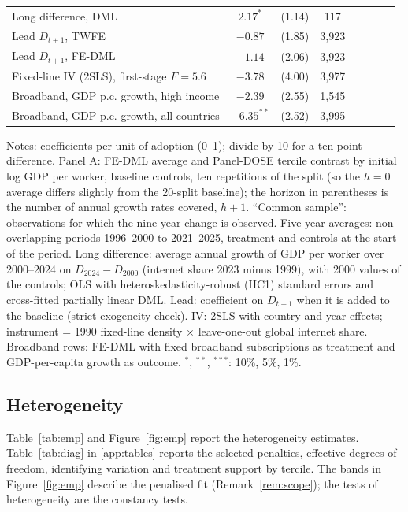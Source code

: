 \documentclass[preprint,12pt,authoryear]{elsarticle}
\begin{document}
\begin{table}[!t]
\begin{threeparttable}
\begin{tabular}{lccccccc}
Long difference, DML & $2.17^{*}$ & (1.14) & 117 \\
Lead $D_{t+1}$, TWFE & $-0.87$ & (1.85) & 3,923 \\
Lead $D_{t+1}$, FE-DML & $-1.14$ & (2.06) & 3,923 \\
Fixed-line IV (2SLS), first-stage $F=5.6$ & $-3.78$ & (4.00) & 3,977 \\
Broadband, GDP p.c. growth, high income & $-2.39$ & (2.55) & 1,545 \\
Broadband, GDP p.c. growth, all countries & $-6.35^{**}$ & (2.52) & 3,995 \\
\bottomrule
\end{tabular}
\begin{tablenotes}\footnotesize
\item Notes: coefficients per unit of adoption (0--1); divide by 10 for a ten-point difference. Panel A: FE-DML average and Panel-DOSE tercile contrast by initial log GDP per worker, baseline controls, ten repetitions of the split (so the $h=0$ average differs slightly from the 20-split baseline); the horizon in parentheses is the number of annual growth rates covered, $h+1$. ``Common sample'': observations for which the nine-year change is observed. Five-year averages: non-overlapping periods 1996--2000 to 2021--2025, treatment and controls at the start of the period. Long difference: average annual growth of GDP per worker over 2000--2024 on $D_{2024}-D_{2000}$ (internet share 2023 minus 1999), with 2000 values of the controls; OLS with heteroskedasticity-robust (HC1) standard errors and cross-fitted partially linear DML. Lead: coefficient on $D_{t+1}$ when it is added to the baseline (strict-exogeneity check). IV: 2SLS with country and year effects; instrument = 1990 fixed-line density $\times$ leave-one-out global internet share. Broadband rows: FE-DML with fixed broadband subscriptions as treatment and GDP-per-capita growth as outcome. $^{*}$, $^{**}$, $^{***}$: 10\%, 5\%, 1\%.
\end{tablenotes}
\end{threeparttable}
\end{table}

\subsection{Heterogeneity}

Table~\ref{tab:emp} and Figure~\ref{fig:emp} report the heterogeneity estimates. Table~\ref{tab:diag} in \ref{app:tables} reports the selected penalties, effective degrees of freedom, identifying variation and treatment support by tercile. The bands in Figure~\ref{fig:emp} describe the penalised fit (Remark~\ref{rem:scope}); the tests of heterogeneity are the constancy tests.
\end{document}
